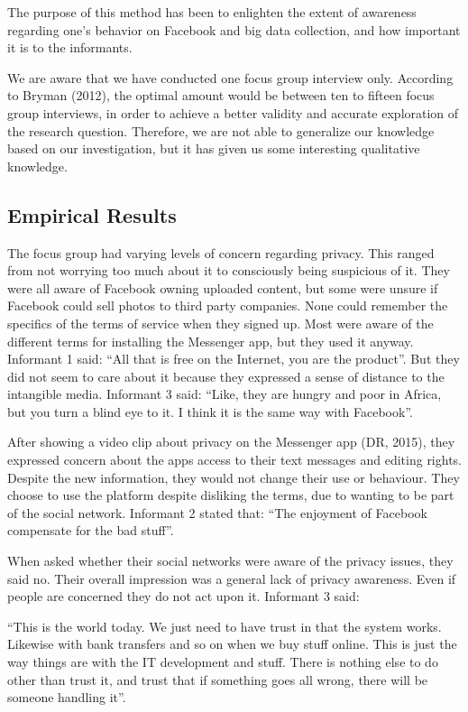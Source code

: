 The purpose of this method has been to enlighten the extent of awareness regarding one's behavior on Facebook and big data collection, and how important it is to the informants.

We are aware that we have conducted one focus group interview only. According to Bryman (2012), the optimal amount would be between ten to fifteen focus group interviews, in order to achieve a better validity and accurate exploration of the research question. Therefore, we are not able to generalize our knowledge based on our investigation, but it has given us some interesting qualitative knowledge.

\subsection{Empirical Results}
The focus group had varying levels of concern regarding privacy. This ranged from not worrying too much about it to consciously being suspicious of it. They were all aware of Facebook owning uploaded content, but some were unsure if Facebook could sell photos to third party companies. None could remember the specifics of the terms of service when they signed up. Most were aware of the different terms for installing the Messenger app, but they used it anyway. Informant 1 said: “All that is free on the Internet, you are the product”. But they did not seem to care about it because they expressed a sense of distance to the intangible media. Informant 3 said: “Like, they are hungry and poor in Africa, but you turn a blind eye to it. I think it is the same way with Facebook”.

After showing a video clip about privacy on the Messenger app (DR, 2015), they expressed concern about the apps access to their text messages and editing rights. Despite the new information, they would not change their use or behaviour. They choose to use the platform despite disliking the terms, due to wanting to be part of the social network. Informant 2 stated that: “The enjoyment of Facebook compensate for the bad stuff”.

When asked whether their social networks were aware of the privacy issues, they said no. Their overall impression was a general lack of privacy awareness. Even if people are concerned they do not act upon it. Informant 3 said:

“This is the world today. We just need to have trust in that the system works. Likewise with bank transfers and so on when we buy stuff online. This is just the way things are with the IT development and stuff. There is nothing else to do other than trust it, and trust that if something goes all wrong, there will be someone handling it”.

